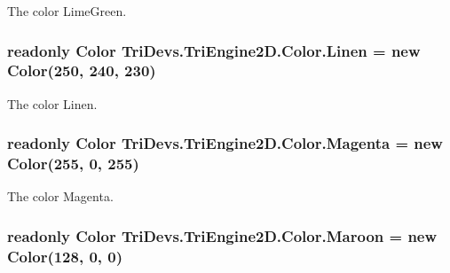 The color Lime\-Green. 

\hypertarget{struct_tri_devs_1_1_tri_engine2_d_1_1_color_a9a2cf760c37d3b94ff85d6536878e5f2}{
\subsubsection[{Linen}]{\setlength{\rightskip}{0pt plus 5cm}readonly {\bf Color} Tri\-Devs.\-Tri\-Engine2\-D.\-Color.\-Linen = new {\bf Color}(250, 240, 230)\hspace{0.3cm}{\ttfamily [static]}}}\label{struct_tri_devs_1_1_tri_engine2_d_1_1_color_a9a2cf760c37d3b94ff85d6536878e5f2}


The color Linen. 

\hypertarget{struct_tri_devs_1_1_tri_engine2_d_1_1_color_a4c07f2d9ba23b380d14332ddfa5eb519}{
\subsubsection[{Magenta}]{\setlength{\rightskip}{0pt plus 5cm}readonly {\bf Color} Tri\-Devs.\-Tri\-Engine2\-D.\-Color.\-Magenta = new {\bf Color}(255, 0, 255)\hspace{0.3cm}{\ttfamily [static]}}}\label{struct_tri_devs_1_1_tri_engine2_d_1_1_color_a4c07f2d9ba23b380d14332ddfa5eb519}


The color Magenta. 

\hypertarget{struct_tri_devs_1_1_tri_engine2_d_1_1_color_a8b265688747842df7f69f02760b83cfc}{
\subsubsection[{Maroon}]{\setlength{\rightskip}{0pt plus 5cm}readonly {\bf Color} Tri\-Devs.\-Tri\-Engine2\-D.\-Color.\-Maroon = new {\bf Color}(128, 0, 0)\hspace{0.3cm}{\ttfamily [static]}}}\label{struct_tri_devs_1_1_tri_engine2_d_1_1_color_a8b265688747842df7f69f02760b83cfc}


